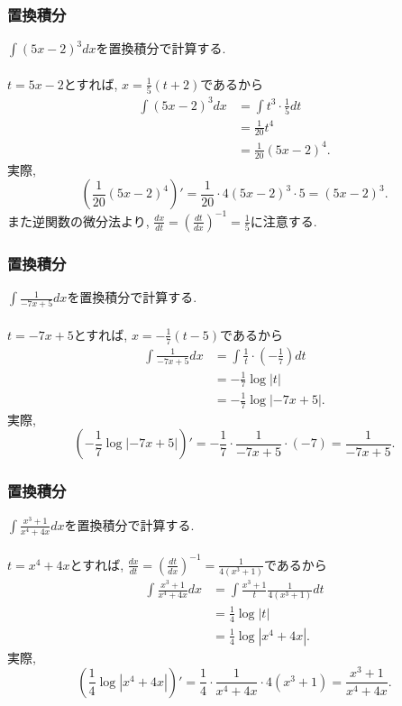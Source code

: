 \begin{frame}
\frametitle{置換積分}

$\int (5x-2)^3dx$を置換積分で計算する. \\
\ \\

$t=5x-2$とすれば, $x=\frac{1}{5}(t+2)$であるから
\begin{align*}
\int (5x-2)^3dx  &= \int t^3 \cdot \frac{1}{5} dt \\
& = \frac{1}{20} t^4 \\
& = \frac{1}{20}(5x-2)^4. 
\end{align*}
実際,
$$
(\frac{1}{20}(5x-2)^4)' = \frac{1}{20} \cdot 4(5x-2)^3\cdot 5=(5x-2)^3. 
$$
また逆関数の微分法より, $\frac{dx}{dt}=(\frac{dt}{dx})^{-1}=\frac{1}{5}$に注意する. 
\end{frame}








\begin{frame}
\frametitle{置換積分}

$\int \frac{1}{-7x+5}dx$を置換積分で計算する. \\
\ \\

$t=-7x+5$とすれば, $x=-\frac{1}{7}(t-5)$であるから
\begin{align*}
\int \frac{1}{-7x+5}dx &= \int \frac{1}{t} \cdot (-\frac{1}{7}) dt \\
& = -\frac{1}{7} \log|t| \\
& =  -\frac{1}{7} \log|-7x+5|. 
\end{align*}
実際,
$$
(-\frac{1}{7} \log|-7x+5|)' = -\frac{1}{7} \cdot \frac{1}{-7x+5}\cdot (-7)= \frac{1}{-7x+5}. 
$$

\end{frame}





\begin{frame}
\frametitle{置換積分}

$\int \frac{x^3+1}{x^4+4x} dx$を置換積分で計算する. \\
\ \\

$t=x^4+4x$とすれば, $\frac{dx}{dt}=(\frac{dt}{dx})^{-1}=\frac{1}{4(x^3+1)}$であるから
\begin{align*}
\int \frac{x^3+1}{x^4+4x} dx &=\int \frac{x^3+1}{t} \frac{1}{4(x^3+1)} dt \\
& = \frac{1}{4} \log|t| \\
& = \frac{1}{4} \log|x^4+4x|. 
\end{align*}
実際,
$$
(\frac{1}{4} \log|x^4+4x|)' = \frac{1}{4} \cdot \frac{1}{x^4+4x}\cdot 4(x^3+1)=  \frac{x^3+1}{x^4+4x}. 
$$


\end{frame}

